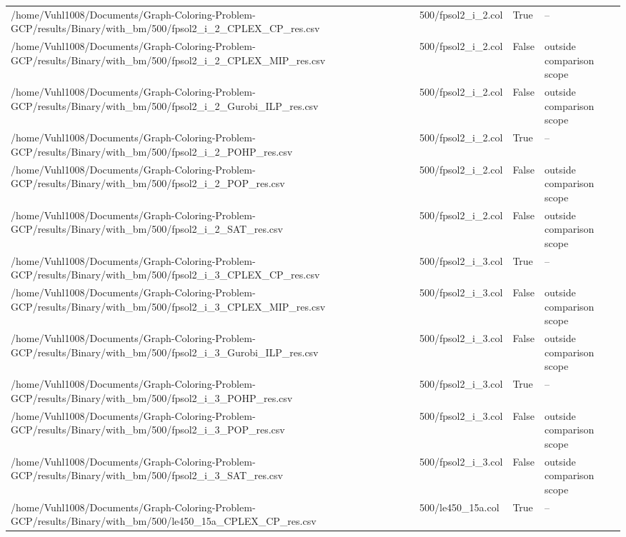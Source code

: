 \begin{table}[htbp]
\begin{tabular}{llll}
/home/Vuhl1008/Documents/Graph-Coloring-Problem-GCP/results/Binary/with\_bm/500/fpsol2\_i\_2\_CPLEX\_CP\_res.csv & 500/fpsol2\_i\_2.col & True & -- \\
/home/Vuhl1008/Documents/Graph-Coloring-Problem-GCP/results/Binary/with\_bm/500/fpsol2\_i\_2\_CPLEX\_MIP\_res.csv & 500/fpsol2\_i\_2.col & False & outside comparison scope \\
/home/Vuhl1008/Documents/Graph-Coloring-Problem-GCP/results/Binary/with\_bm/500/fpsol2\_i\_2\_Gurobi\_ILP\_res.csv & 500/fpsol2\_i\_2.col & False & outside comparison scope \\
/home/Vuhl1008/Documents/Graph-Coloring-Problem-GCP/results/Binary/with\_bm/500/fpsol2\_i\_2\_POHP\_res.csv & 500/fpsol2\_i\_2.col & True & -- \\
/home/Vuhl1008/Documents/Graph-Coloring-Problem-GCP/results/Binary/with\_bm/500/fpsol2\_i\_2\_POP\_res.csv & 500/fpsol2\_i\_2.col & False & outside comparison scope \\
/home/Vuhl1008/Documents/Graph-Coloring-Problem-GCP/results/Binary/with\_bm/500/fpsol2\_i\_2\_SAT\_res.csv & 500/fpsol2\_i\_2.col & False & outside comparison scope \\
/home/Vuhl1008/Documents/Graph-Coloring-Problem-GCP/results/Binary/with\_bm/500/fpsol2\_i\_3\_CPLEX\_CP\_res.csv & 500/fpsol2\_i\_3.col & True & -- \\
/home/Vuhl1008/Documents/Graph-Coloring-Problem-GCP/results/Binary/with\_bm/500/fpsol2\_i\_3\_CPLEX\_MIP\_res.csv & 500/fpsol2\_i\_3.col & False & outside comparison scope \\
/home/Vuhl1008/Documents/Graph-Coloring-Problem-GCP/results/Binary/with\_bm/500/fpsol2\_i\_3\_Gurobi\_ILP\_res.csv & 500/fpsol2\_i\_3.col & False & outside comparison scope \\
/home/Vuhl1008/Documents/Graph-Coloring-Problem-GCP/results/Binary/with\_bm/500/fpsol2\_i\_3\_POHP\_res.csv & 500/fpsol2\_i\_3.col & True & -- \\
/home/Vuhl1008/Documents/Graph-Coloring-Problem-GCP/results/Binary/with\_bm/500/fpsol2\_i\_3\_POP\_res.csv & 500/fpsol2\_i\_3.col & False & outside comparison scope \\
/home/Vuhl1008/Documents/Graph-Coloring-Problem-GCP/results/Binary/with\_bm/500/fpsol2\_i\_3\_SAT\_res.csv & 500/fpsol2\_i\_3.col & False & outside comparison scope \\
/home/Vuhl1008/Documents/Graph-Coloring-Problem-GCP/results/Binary/with\_bm/500/le450\_15a\_CPLEX\_CP\_res.csv & 500/le450\_15a.col & True & -- \\

\end{tabular}
\end{table}
